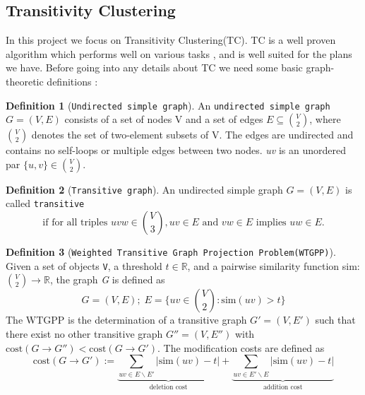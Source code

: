 \documentclass[a4paper,10pt]{article}
\theoremstyle{plain}
\theoremstyle{definition}
\newtheorem{defn}{Definition}
\begin{document}
\subsection{Transitivity Clustering}
\label{sec:transClust}
In this project we focus on Transitivity Clustering(TC). TC is a well proven algorithm which performs well on various tasks \cite{clustEval}, and is well suited for the plans we have.
Before going into any details about TC we need some basic graph-theoretic definitions \cite{extensionAndRobustnessTC}:
\begin{defn}[\texttt{Undirected simple graph}]\label{def:Undirected simple graph}
	An \texttt{undirected simple graph} $G = (V, E)$ consists of a set of nodes V and a set of edges $E \subseteq {V \choose 2}$, where ${V \choose 2}$ denotes the set of two-element subsets of V. The edges are undirected and contains no self-loops or multiple edges between two nodes. \textit{uv} is an unordered par $\{u, v \} \in {V \choose 2}$.
\end{defn}

\begin{defn}[\texttt{Transitive graph}]\label{def:Transitive graph}
	An undirected simple graph $G = (V, E)$ is called \texttt{transitive} 
	\begin{equation*}
	\text{if for all triples } uvw \in {V \choose 3}, uv \in E \text{ and } vw \in E \text{ implies } uw \in E.
	\end{equation*}
\end{defn}

\begin{defn}[\texttt{Weighted Transitive Graph Projection Problem(WTGPP)}]\label{def:WTGPP}
	 Given a set of objects \texttt{V}, a threshold $t \in \mathbb{R}$, and a pairwise similarity function sim: ${V \choose 2} \rightarrow \mathbb{R}$, the graph \textit{G} is defined as
	 \begin{equation}\label{eq:sim above threshold}
	 G = (V, E); \; E = \bigg\{ uv \in {V \choose 2} : \text{sim}(uv) > t\bigg\}
	 \end{equation}
	 The WTGPP is the determination of a transitive graph $G' = (V, E')$ such that there exist no other transitive graph $G'' = (V, E'')$ with $\text{cost}(G \rightarrow G'') < \text{cost}(G \rightarrow G')$. The modification costs are defined as
	 \begin{equation}\label{eq:TC cost function}
		 \text{cost}(G \rightarrow G') := \underbrace{\sum_{uv \in E \backslash E'} | \text{sim}(uv) - t |}_{\text{deletion cost}} + \underbrace{\sum_{uv \in E' \backslash E} | \text{sim}(uv) - t |}_{\text{addition cost}}
	 \end{equation}
\end{defn}
\end{document}
